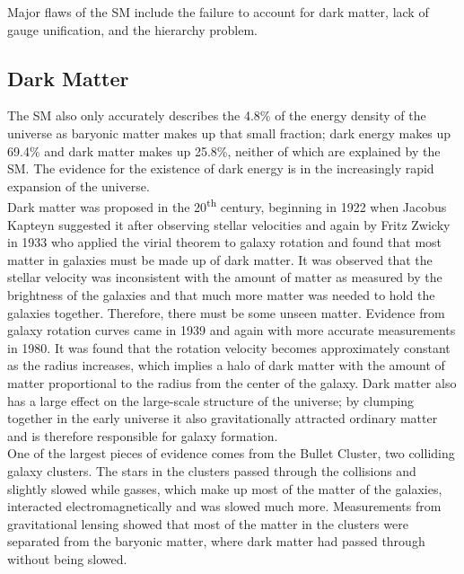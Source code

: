 Major flaws of the SM include the failure to account for dark matter, lack of gauge unification, and the hierarchy problem.  \\

\subsection{Dark Matter}

The SM also only accurately describes the 4.8\% of the energy density of the universe as baryonic matter makes up that small fraction; dark energy makes up 69.4\% and dark matter makes up 25.8\%\cite{planckpaper}, neither of which are explained by the SM.  The evidence for the existence of dark energy is in the increasingly rapid expansion of the universe.  \\

Dark matter was proposed in the 20\textsuperscript{th} century, beginning in 1922 when Jacobus Kapteyn suggested it after observing stellar velocities\cite{dm1} and again by Fritz Zwicky in 1933 who applied the virial theorem to galaxy rotation and found that most matter in galaxies must be made up of dark matter\cite{dm2}.  It was observed that the stellar velocity was inconsistent with the amount of matter as measured by the brightness of the galaxies and that much more matter was needed to hold the galaxies together.  Therefore, there must be some unseen matter.  Evidence from galaxy rotation curves came in 1939\cite{dm3} and again with more accurate measurements in 1980\cite{dm4}.  It was found that the rotation velocity becomes approximately constant as the radius increases, which implies a halo of dark matter with the amount of matter proportional to the radius from the center of the galaxy.  Dark matter also has a large effect on the large-scale structure of the universe; by clumping together in the early universe it also gravitationally attracted ordinary matter and is therefore responsible for galaxy formation.  \\

One of the largest pieces of evidence comes from the Bullet Cluster\cite{bulletcluster}, two colliding galaxy clusters.  The stars in the clusters passed through the collisions and slightly slowed while gasses, which make up most of the matter of the galaxies, interacted electromagnetically and was slowed much more.  Measurements from gravitational lensing showed that most of the matter in the clusters were separated from the baryonic matter, where dark matter had passed through without being slowed.  \\

